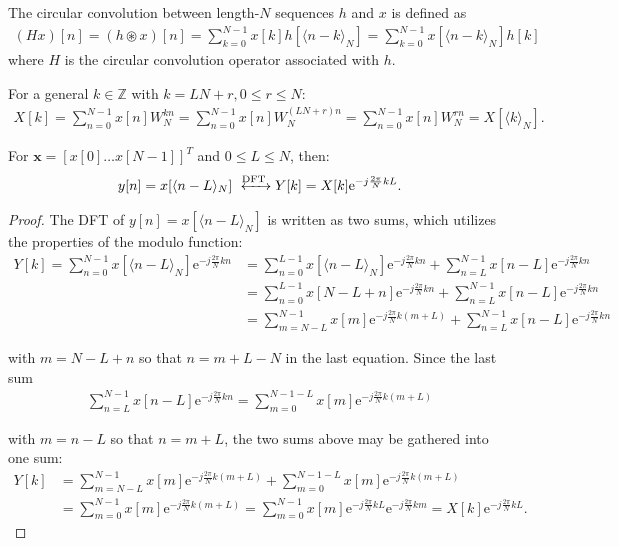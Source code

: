 \begin{definition}
 	The circular convolution between length-$N$ sequences $h$ 		and $x$ is defined as
	\begin{align*}
	(Hx)[n] = (h \circledast x)[n] = \sum_{k = 0}^{N-1} x[k] 		h[\langle n-k\rangle_N] =\sum_{k = 0}^{N-1} x[\langle n-k		\rangle_N] h[k]
	\end{align*}
	where $H$ is the circular convolution operator associated 		with $h$.
\end{definition}

For a general $k\in\mathbb{Z}$ with $k = LN + r, 0 \leq r \leq N$:
\begin{align*}
X[k] = \sum_{n=0}^{N-1} x[n] W_N^{kn} = \sum_{n=0}^{N-1} x[n] W_N^{(LN+r)n} = \sum_{n=0}^{N-1} x[n] W_N^{rn} = X[\langle k\rangle_N].
\end{align*}

\begin{lemma}
For $\textbf{x} = [x[0] \dots x[N-1]]^T$ and $0 \leq L \leq N$, then:
\begin{align*}
y[n]  = x[\langle n-L\rangle_N] \xleftrightarrow{\text{DFT}} Y[k] = X[k] \text{e}^{-j\frac{2\pi}{N} kL}.
\end{align*}
\end{lemma}

\begin{proof}
The DFT of $y[n] = x[\langle n-L\rangle_N]$ is written as two sums, which utilizes the properties of the modulo function:
\begin{align*}
Y[k] = \sum_{n=0}^{N-1} x[\langle n-L\rangle_N] \text{e}^{-j\frac{2\pi}{N} kn} &= \sum_{n=0}^{L-1} x[\langle n-L\rangle_N]\text{e}^{-j\frac{2\pi}{N} kn} + \sum_{n=L}^{N-1} x[n-L]\text{e}^{-j\frac{2\pi}{N} kn} \\
&= \sum_{n=0}^{L-1} x[N-L+n]\text{e}^{-j\frac{2\pi}{N} kn} + \sum_{n=L}^{N-1} x[n-L]\text{e}^{-j\frac{2\pi}{N} kn} \\
&= \sum_{m=N-L}^{N-1} x[m]\text{e}^{-j\frac{2\pi}{N} k(m+L)} + \sum_{n=L}^{N-1} x[n-L]\text{e}^{-j\frac{2\pi}{N} kn}
\end{align*}

with $m = N - L + n$ so that $n = m + L - N$ in the last equation. Since the last sum
\begin{align*}
\sum_{n=L}^{N-1} x[n-L]\text{e}^{-j\frac{2\pi}{N} kn} = \sum_{m=0}^{N-1-L} x[m] \text{e}^{-j\frac{2\pi}{N}k(m+L)}
\end{align*}

with $m = n - L$ so that $n = m + L$, the two sums above may be gathered into one sum:
\begin{align*}
Y[k] &= \sum_{m=N-L}^{N-1} x[m]\text{e}^{-j\frac{2\pi}{N} k(m+L)} + \sum_{m=0}^{N-1-L} x[m] \text{e}^{-j\frac{2\pi}{N}k(m+L)}  \\
&= \sum_{m=0}^{N-1} x[m] \text{e}^{-j\frac{2\pi}{N}k(m+L)} = \sum_{m=0}^{N-1} x[m] \text{e}^{-j\frac{2\pi}{N}kL}\text{e}^{-j\frac{2\pi}{N}km} = X[k] \text{e}^{-j\frac{2\pi}{N}kL}.
\end{align*}
\end{proof}

